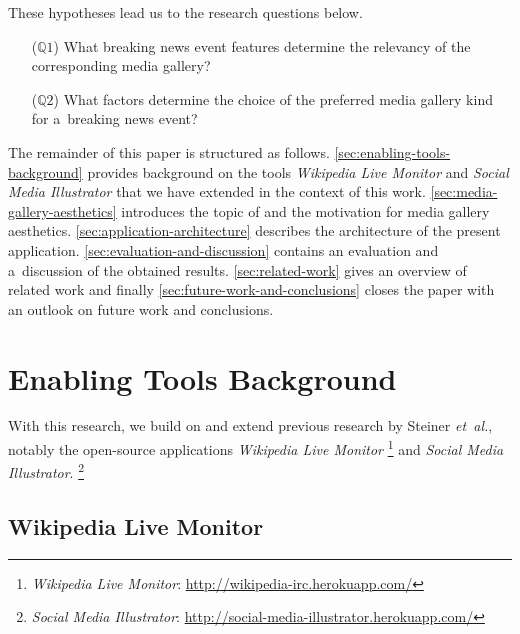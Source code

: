 \documentclass{sig-alternate}
\newcommand{\inlinelistingsize}{\fontsize{8pt}{11pt}}
\let\oldurl\url
\renewcommand{\url}[1]{\inlinelistingsize\oldurl{#1}}
\begin{document}
\noindent These hypotheses lead us to the research questions below.

\begin{itemize}
  \itemsep0em
  \item[($\mathbb{Q}1$)] What breaking news event features
    determine the relevancy of the corresponding media gallery?
  \item[($\mathbb{Q}2$)] What factors determine the choice
    of the preferred media gallery kind for a~breaking news event?
\end{itemize}

The remainder of this paper is structured as follows.
\autoref{sec:enabling-tools-background} provides background
on the tools \emph{Wikipedia Live Monitor} and
\emph{Social Media Illustrator} that we have extended
in the context of this work.
\autoref{sec:media-gallery-aesthetics} introduces the topic of
and the motivation for media gallery aesthetics.
\autoref{sec:application-architecture} describes the architecture
of the present application.
\autoref{sec:evaluation-and-discussion} contains an evaluation
and a~discussion of the obtained results.
\autoref{sec:related-work} gives an overview of related work
and finally \autoref{sec:future-work-and-conclusions}
closes the paper with an outlook on future work
and conclusions.

\section{Enabling Tools Background}
\label{sec:enabling-tools-background}
\selectfont

With this research, we build on and extend previous research
by Steiner \emph{et~al.}, notably
the open-source applications \emph{Wikipedia Live Monitor}%
\footnote{\emph{Wikipedia Live Monitor}:
\url{http://wikipedia-irc.herokuapp.com/}}
and \emph{Social Media Illustrator}.%
\footnote{\emph{Social Media Illustrator}:
\url{http://social-media-illustrator.herokuapp.com/}}

\subsection{Wikipedia Live Monitor}
\end{document}
